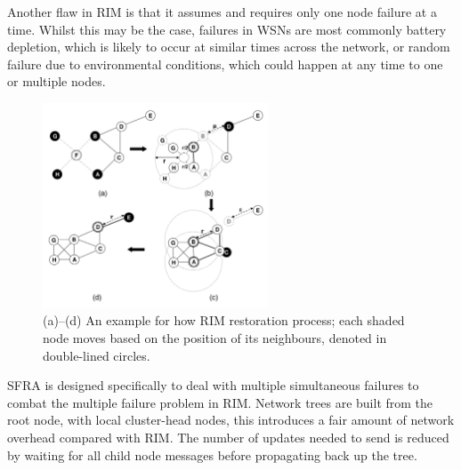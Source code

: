 \documentclass[authoryearcitations]{UoYCSproject}
\begin{document}

Another flaw in RIM is that it assumes and requires only one node failure at a time. Whilst this may be the case, failures in WSNs are most commonly battery depletion, which is likely to occur at similar times across the network, or random failure due to environmental conditions, which could happen at any time to one or multiple nodes.

\begin{figure}
 \centering
    \includegraphics[width=0.6\textwidth]{figures/rim.png}
    \caption{(a)--(d) An example for how RIM restoration process; each shaded node moves based on the position of its neighbours, denoted in double-lined circles.}
    \label{fig:rim}
\end{figure}



SFRA \citep{Alfadhly2012} is designed specifically to deal with multiple simultaneous failures to combat the multiple failure problem in RIM. Network trees are built from the root node, with local cluster-head nodes, this introduces a fair amount of network overhead compared with RIM. The number of updates needed to send is reduced by waiting for all child node messages before propagating back up the tree.
\end{document}
